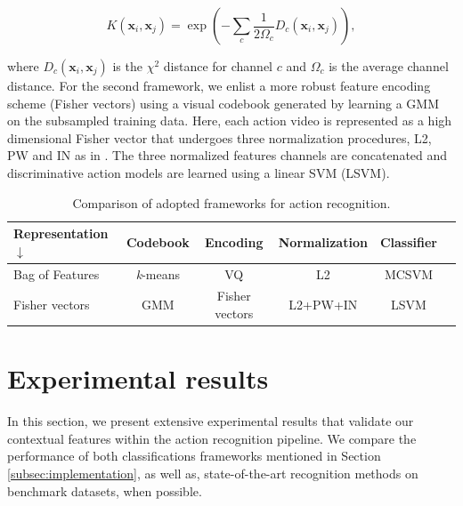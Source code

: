 \documentclass[runningheads]{llncs}
\begin{document}
\begin{equation}
K(\mathbf{x}_i,\mathbf{x}_j)= \exp\left(-\sum_c {\frac{1}{2\Omega_c} D_c(\mathbf{x}_i,\mathbf{x}_j)}\right),
\label{eq:multichannel}
\end{equation}

\noindent where $D_c(\mathbf{x}_i,\mathbf{x}_j)$ is the $\chi^2$ distance for channel $c$ and $\Omega_c$ is the average channel distance. For the second framework, we enlist a more robust feature encoding scheme (Fisher vectors) using a visual codebook generated by learning a GMM on the subsampled training data. Here, each action video is represented as a high dimensional Fisher vector that undergoes three normalization procedures, L2, PW and IN as in \cite{xwang2013}. The three normalized features channels are concatenated and discriminative action models are learned using a linear SVM (LSVM).




\begin{table}[h!]
\caption{Comparison of adopted frameworks for action recognition.}
\begin{center}
{
\begin{tabular}{ l| c c c c c }
\hline
Representation $\downarrow$ & Codebook & Encoding & Normalization & Classifier \\
\hline
Bag of Features & \textit{k}-means & VQ & L2 & MCSVM \\
Fisher vectors & GMM & Fisher vectors & L2+PW+IN & LSVM \\
\hline
\end{tabular}
}
\end{center}
\label{tab:frameworks}
\end{table}

\vspace{-12pt}
\section{Experimental results}\label{results}
In this section, we present extensive experimental results that validate our contextual features within the action recognition pipeline. We compare the performance of both classifications frameworks mentioned in Section \ref{subsec:implementation}, as well as, state-of-the-art recognition methods on benchmark datasets, when possible.
\end{document}

